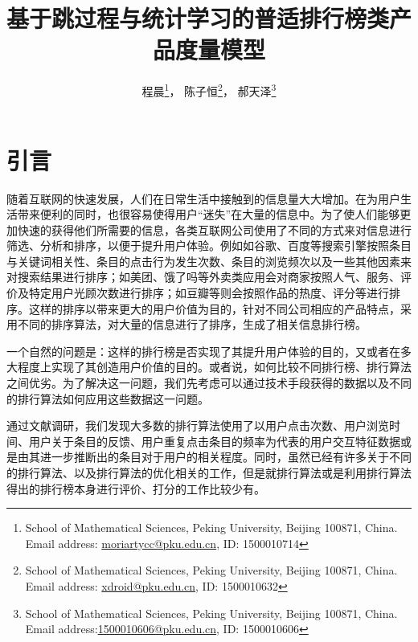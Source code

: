 \documentclass[UTF8]{ctexart}
\theoremstyle{plain}
\theoremstyle{definition}
\theoremstyle{remark}
\begin{document}
	\setcounter{footnote}{1}
	\title{基于跳过程与统计学习的普适排行榜类产品度量模型}
	\author{程晨\footnote{School of Mathematical Sciences, Peking University, Beijing 100871, China. Email address:
			\href{mailto:moriartycc@pku.edu.cn}{moriartycc@pku.edu.cn}, ID: 1500010714}， \quad 陈子恒\footnote{School of Mathematical Sciences, Peking University, Beijing 100871, China.  Email address:
			\href{mailto:xdroid@pku.edu.cn}{xdroid@pku.edu.cn}, ID: 1500010632}， \quad 郝天泽\footnote{School of Mathematical Sciences, Peking University, Beijing 100871, China. Email address:\href{mailto:1500010606@pku.edu.cn}{1500010606@pku.edu.cn}, ID: 1500010606}}
	\date{}
	\maketitle
	\newpage
	\tableofcontents
	\newpage
	\section{引言}
    随着互联网的快速发展，人们在日常生活中接触到的信息量大大增加。在为用户生活带来便利的同时，也很容易使得用户“迷失”在大量的信息中。为了使人们能够更加快速的获得他们所需要的信息，各类互联网公司使用了不同的方式来对信息进行筛选、分析和排序，以便于提升用户体验。例如如谷歌、百度等搜索引擎按照条目与关键词相关性、条目的点击行为发生次数、条目的浏览频次以及一些其他因素来对搜索结果进行排序；如美团、饿了吗等外卖类应用会对商家按照人气、服务、评价及特定用户光顾次数进行排序；如豆瓣等则会按照作品的热度、评分等进行排序。这样的排序以带来更大的用户价值为目的，针对不同公司相应的产品特点，采用不同的排序算法，对大量的信息进行了排序，生成了相关信息排行榜。

    一个自然的问题是：这样的排行榜是否实现了其提升用户体验的目的，又或者在多大程度上实现了其创造用户价值的目的。或者说，如何比较不同排行榜、排行算法之间优劣。为了解决这一问题，我们先考虑可以通过技术手段获得的数据以及不同的排行算法如何应用这些数据这一问题。

    通过文献调研\cite{agichtein2006improving}\cite{barrett2009enhanced}\cite{nematzadeh2017algorithmic}\cite{nie2005object}\cite{zehlike2017fa}，我们发现大多数的排行算法使用了以用户点击次数、用户浏览时间、用户关于条目的反馈、用户重复点击条目的频率为代表的用户交互特征数据或是由其进一步推断出的条目对于用户的相关程度。同时，虽然已经有许多关于不同的排行算法、以及排行算法的优化相关的工作，但是就排行算法或是利用排行算法得出的排行榜本身进行评价、打分的工作比较少有。
\end{document}
